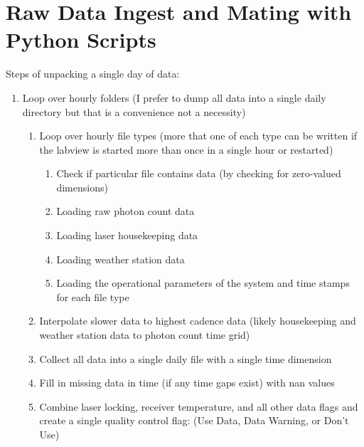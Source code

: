 
\section{Raw Data Ingest and Mating with Python Scripts}


Steps of unpacking a single day of data:
\begin{enumerate}
	\item{Loop over hourly folders (I prefer to dump all data into a single daily directory but that is a convenience not a necessity)}
	\begin{enumerate}
		\item{Loop over hourly file types (more that one of each type can be written if the labview is started more than once in a single hour or restarted)}
			\begin{enumerate}
				\item{Check if particular file contains data (by checking for zero-valued dimensions)}
				\item{Loading raw photon count data}
				\item{Loading laser housekeeping data}
				\item{Loading weather station data}
				\item{Loading the operational parameters of the system and time stamps for each file type}
			\end{enumerate}
		\item{Interpolate slower data to highest cadence data (likely housekeeping and weather station data to photon count time grid)}
		\item{Collect all data into a single daily file with a single time dimension}
		\item{Fill in missing data in time (if any time gaps exist) with nan values}
		\item{Combine laser locking, receiver temperature, and all other data flags and create a single quality control flag: (Use Data, Data Warning, or Don't Use)}
	\end{enumerate}
\end{enumerate}


\newpage


